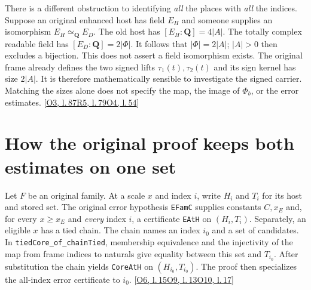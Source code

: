 \documentclass[12pt,letterpaper]{article}
\newcommand{\id}[1]{{\small\nolinkurl{#1}}}
\begin{document}
There is a different obstruction to identifying \emph{all} the places with \emph{all} the indices. Suppose an original enhanced host has field $E_H$ and someone supplies an isomorphism $E_H\simeq_{\mathbf Q} E_D$. The old host has $[E_H:\mathbf Q]=4|A|$. The totally complex readable field has $[E_D:\mathbf Q]=2|\Phi|$. It follows that $|\Phi|=2|A|$; $|A|>0$ then excludes a bijection. This does not assert a field isomorphism exists. The original frame already defines the two signed lifts $\tau_1(t),\tau_2(t)$ and its sign kernel has size $2|A|$. It is therefore mathematically sensible to investigate the signed carrier. Matching the sizes alone does not specify the map, the image of $\Phi_b$, or the error estimates. {\footnotesize\sffamily\color{mute}[\href{https://github.com/nousentllc/riemann-hypothesis/blob/40e56bab026552e089d7afcfeff08d2defb9c005/src/Formalism/SharpRestriction/RamificationFrobenius/TotientGaloisClasses/ConjEMemHostFIff.lean#L87}{O3, l.\,87}\enspace \href{https://github.com/leanprover-community/riemann-hypothesis/blob/e063a923620ee7787b4a1270421478645bf66bdb/src/Lib/General/NumberTheory/EmbeddingsAndDifferent.lean#L79}{R5, l.\,79}\enspace \href{https://github.com/nousentllc/riemann-hypothesis/blob/40e56bab026552e089d7afcfeff08d2defb9c005/src/Formalism/SharpRestriction/RamificationFrobenius/TotientGaloisClasses/FrameFacts.lean#L54}{O4, l.\,54}]}

\section{How the original proof keeps both estimates on one set}
Let $F$ be an original family. At a scale $x$ and index $i$, write $H_i$ and $T_i$ for its host and stored set. The original error hypothesis \id{EFamC} supplies constants $C,x_E$ and, for every $x\geq x_E$ and \emph{every} index $i$, a certificate \id{EAtH} on $(H_i,T_i)$. Separately, an eligible $x$ has a tied chain. The chain names an index $i_0$ and a set of candidates. In \id{tiedCore_of_chainTied}, membership equivalence and the injectivity of the map from frame indices to naturals give equality between this set and $T_{i_0}$. After substitution the chain yields \id{CoreAtH} on $(H_{i_0},T_{i_0})$. The proof then specializes the all-index error certificate to $i_0$. {\footnotesize\sffamily\color{mute}[\href{https://github.com/nousentllc/riemann-hypothesis/blob/40e56bab026552e089d7afcfeff08d2defb9c005/src/Formalism/SharpRestriction/RamificationFrobenius/TotientGaloisClasses/TopDefs.lean#L15}{O6, l.\,15}\enspace \href{https://github.com/nousentllc/riemann-hypothesis/blob/40e56bab026552e089d7afcfeff08d2defb9c005/src/Development/AutomorphicArithmetic/PrimitiveCosets/LevelGmLeOnFamilyScales.lean#L13}{O9, l.\,13}\enspace \href{https://github.com/nousentllc/riemann-hypothesis/blob/40e56bab026552e089d7afcfeff08d2defb9c005/src/Development/AutomorphicArithmetic/PrimitiveCosets/WindowInequalityOfArtinInputs.lean#L17}{O10, l.\,17}]}
\end{document}

